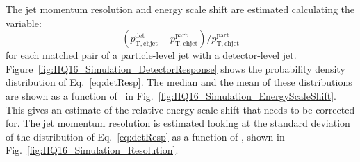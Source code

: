 The jet momentum resolution and energy scale shift are estimated calculating the variable:
\begin{equation}
(p_{\mathrm{T,ch jet}}^{\mathrm{det}} - p_{\mathrm{T,ch jet}}^{\mathrm{part}}) / p_{\mathrm{T,ch jet}}^{\mathrm{part}}
\label{eq:detResp}
\end{equation}
for each matched pair of a particle-level jet with a detector-level jet.
Figure~\ref{fig:HQ16_Simulation_DetectorResponse} shows the probability density distribution of Eq.~\ref{eq:detResp}.
The median and the mean of these distributions are shown as a function of \ptchjetgen\ in Fig.~\ref{fig:HQ16_Simulation_EnergyScaleShift}.
This gives an estimate of the relative energy scale shift that needs to be corrected for.
The jet momentum resolution is estimated looking at the standard deviation of the distribution of Eq.~\ref{eq:detResp} as a function
of \ptchjetgen, shown in Fig.~\ref{fig:HQ16_Simulation_Resolution}.
